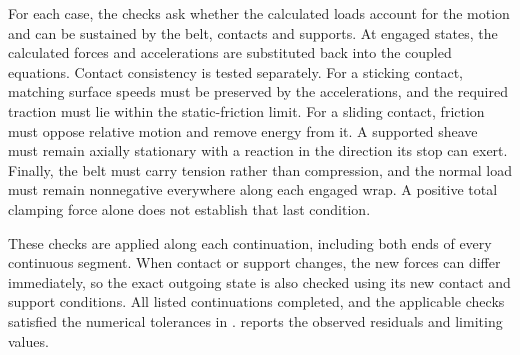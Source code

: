 \documentclass[11pt]{report}
\numberwithin{equation}{section}
\begin{document}
For each case, the checks ask whether the calculated loads account for the
motion and can be sustained by the belt, contacts and supports. At engaged
states, the calculated forces and accelerations are substituted back into
the coupled equations. Contact consistency is tested separately. For a
sticking contact, matching surface speeds must be preserved by the
accelerations, and the required traction must lie within the static-friction
limit. For a sliding contact, friction must oppose relative motion and remove
energy from it. A supported sheave must remain axially stationary with a reaction in the direction its stop can exert. Finally, the belt must carry tension rather
than compression, and the normal load must remain nonnegative everywhere
along each engaged wrap. A positive total clamping force alone does not
establish that last condition.

These checks are applied along each continuation, including both ends of
every continuous segment. When contact or support changes, the new forces
can differ immediately, so the exact outgoing state is also checked using
its new contact and support conditions. All listed continuations completed,
and the applicable checks satisfied the numerical tolerances in
. 
reports the observed residuals and limiting values.
\end{document}
